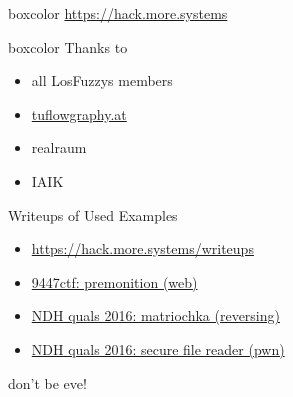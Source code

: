 {
\begin{frame}[plain]

  \begin{center}
  	\begin{beamercolorbox}[sep=0.5em,wd=10cm]{boxcolor}
	    \color{white}
	    {\huge \url{https://hack.more.systems}}
	\end{beamercolorbox}
  \end{center}

  \vspace{3em}


  \begin{beamercolorbox}[sep=1em,wd=5cm]{boxcolor}
    Thanks to

    \begin{itemize}
      \item all LosFuzzys members
      \item \url{tuflowgraphy.at}
      \item realraum
      \item IAIK
    \end{itemize}
  \end{beamercolorbox}

\end{frame}
}

\begin{frame}
  {Writeups of Used Examples}

  \begin{itemize}
    \item \url{https://hack.more.systems/writeups}
  \end{itemize}

  \begin{itemize}
    \item
      \href{http://losfuzzys.github.io/writeup/2015/12/07/9447ctf-premonition/}
      {9447ctf: premonition (web)}
    \item \href{https://losfuzzys.github.io/writeup/2016/04/04/ndhquals2016-matriochka/}
      {NDH quals 2016: matriochka (reversing)}
    \item \href{https://losfuzzys.github.io/writeup/2016/04/04/ndhquals2016-secure-file-reader/}
      {NDH quals 2016: secure file reader (pwn)}
  \end{itemize}

  \vspace{3em}

  don't be eve!

\end{frame}

